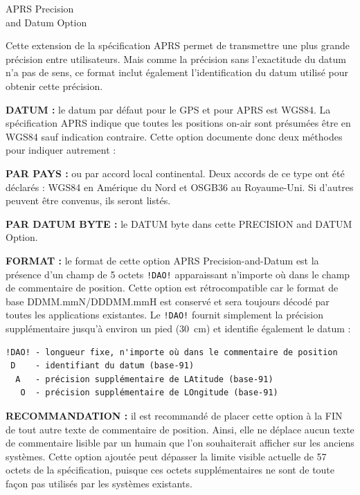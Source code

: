 \begin{aprssideblock}{APRS Precision\\and Datum Option}
\label{aprs-precision-and-datum-option}
Cette extension de la spécification APRS permet de transmettre une plus
grande précision entre utilisateurs. Mais comme la précision sans
l'exactitude du datum n'a pas de sens, ce format inclut également
l'identification du datum utilisé pour obtenir cette précision.

\textbf{DATUM :} le datum par défaut pour le GPS et pour APRS est WGS84. La
spécification APRS indique que toutes les positions on-air sont présumées
être en WGS84 sauf indication contraire. Cette \guillemotleft{}option\guillemotright{}
documente donc deux méthodes pour \guillemotleft{}indiquer autrement\guillemotright{} :

\textbf{PAR PAYS :} ou par accord local continental. Deux accords de ce type
ont été déclarés : WGS84 en Amérique du Nord et OSGB36 au Royaume-Uni. Si
d'autres peuvent être convenus, ils seront listés.

\textbf{PAR DATUM BYTE :} le DATUM byte dans cette \guillemotleft{}PRECISION
and DATUM Option\guillemotright{}.

\textbf{FORMAT :} le format de cette option APRS Precision-and-Datum est la
présence d'un champ de 5 octets \texttt{!DAO!} apparaissant n'importe où dans
le champ de commentaire de position. Cette option est rétrocompatible car le
format de base DDMM.mmN/DDDMM.mmH est conservé et sera toujours décodé par
toutes les applications existantes. Le \texttt{!DAO!} fournit simplement la
précision supplémentaire jusqu'à environ un pied (30~cm) et identifie
également le datum :

\begin{verbatim}
!DAO! - longueur fixe, n'importe où dans le commentaire de position
 D    - identifiant du datum (base-91)
  A   - précision supplémentaire de LAtitude (base-91)
   O  - précision supplémentaire de LOngitude (base-91)
\end{verbatim}

\textbf{RECOMMANDATION :} il est recommandé de placer cette option à la FIN
de tout autre texte de commentaire de position. Ainsi, elle ne déplace aucun
texte de commentaire lisible par un humain que l'on souhaiterait afficher sur
les anciens systèmes. Cette option ajoutée peut dépasser la limite
\guillemotleft{}visible\guillemotright{} actuelle de 57 octets de la
spécification, puisque ces octets supplémentaires ne sont de toute façon pas
utilisés par les systèmes existants.


\end{aprssideblock}
